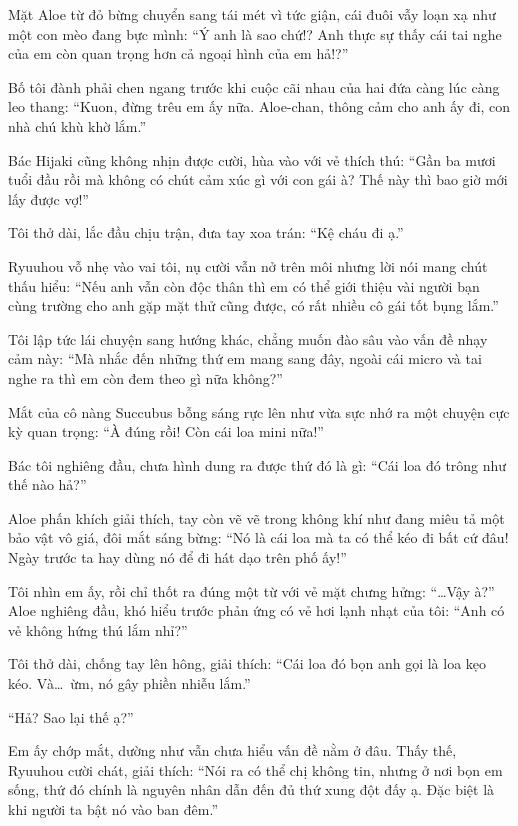 \documentclass[../main.tex]{subfiles}
\begin{document}
Mặt Aloe từ đỏ bừng chuyển sang tái mét vì tức giận, cái đuôi vẫy loạn xạ như một con mèo đang bực mình: ``Ý anh là sao chứ!? Anh thực sự thấy cái tai nghe của em còn quan trọng hơn cả ngoại hình của em hả!?''

Bố tôi đành phải chen ngang trước khi cuộc cãi nhau của hai đứa càng lúc càng leo thang: ``Kuon, đừng trêu em ấy nữa. Aloe-chan, thông cảm cho anh ấy đi, con nhà chú khù khờ lắm.''

Bác Hijaki cũng không nhịn được cười, hùa vào với vẻ thích thú: ``Gần ba mươi tuổi đầu rồi mà không có chút cảm xúc gì với con gái à? Thế này thì bao giờ mới lấy được vợ!''

Tôi thở dài, lắc đầu chịu trận, đưa tay xoa trán: ``Kệ cháu đi ạ.''

Ryuuhou vỗ nhẹ vào vai tôi, nụ cười vẫn nở trên môi nhưng lời nói mang chút thấu hiểu: ``Nếu anh vẫn còn độc thân thì em có thể giới thiệu vài người bạn cùng trường cho anh gặp mặt thử cũng được, có rất nhiều cô gái tốt bụng lắm.''

Tôi lập tức lái chuyện sang hướng khác, chẳng muốn đào sâu vào vấn đề nhạy cảm này: ``Mà nhắc đến những thứ em mang sang đây, ngoài cái micro và tai nghe ra thì em còn đem theo gì nữa không?''

Mắt của cô nàng Succubus bỗng sáng rực lên như vừa sực nhớ ra một chuyện cực kỳ quan trọng: ``À đúng rồi! Còn cái loa mini nữa!''

Bác tôi nghiêng đầu, chưa hình dung ra được thứ đó là gì: ``Cái loa đó trông như thế nào hả?''

Aloe phấn khích giải thích, tay còn vẽ vẽ trong không khí như đang miêu tả một bảo vật vô giá, đôi mắt sáng bừng: ``Nó là cái loa mà ta có thể kéo đi bất cứ đâu! Ngày trước ta hay dùng nó để đi hát dạo trên phố ấy!''

Tôi nhìn em ấy, rồi chỉ thốt ra đúng một từ với vẻ mặt chưng hửng: ``\dots Vậy à?'' Aloe nghiêng đầu, khó hiểu trước phản ứng có vẻ hơi lạnh nhạt của tôi: ``Anh có vẻ không hứng thú lắm nhỉ?''

Tôi thở dài, chống tay lên hông, giải thích: ``Cái loa đó bọn anh gọi là loa kẹo kéo. Và\dots\ ừm, nó gây phiền nhiễu lắm.''

``Hả? Sao lại thế ạ?''

Em ấy chớp mắt, dường như vẫn chưa hiểu vấn đề nằm ở đâu. Thấy thế, Ryuuhou cười chát, giải thích: ``Nói ra có thể chị không tin, nhưng ở nơi bọn em sống, thứ đó chính là nguyên nhân dẫn đến đủ thứ xung đột đấy ạ. Đặc biệt là khi người ta bật nó vào ban đêm.''
\end{document}
